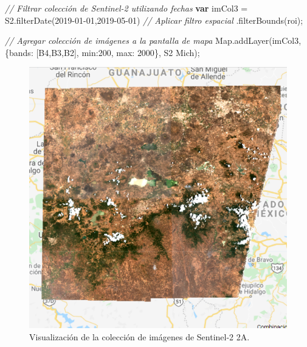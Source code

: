 \documentclass[
  12pt,
  letterpaper,
  twoside]{book}
\newenvironment{Shaded}{\begin{snugshade}}{\end{snugshade}}
\newcommand{\BuiltInTok}[1]{#1}
\newcommand{\CommentTok}[1]{\textcolor[rgb]{0.24,0.58,0.00}{\textit{#1}}}
\newcommand{\DataTypeTok}[1]{\textcolor[rgb]{0.00,0.00,0.00}{#1}}
\newcommand{\DecValTok}[1]{\textcolor[rgb]{0.28,0.53,0.93}{#1}}
\newcommand{\FunctionTok}[1]{\textcolor[rgb]{0.48,0.12,0.64}{#1}}
\newcommand{\KeywordTok}[1]{\textcolor[rgb]{0.00,0.00,0.00}{\textbf{#1}}}
\newcommand{\NormalTok}[1]{#1}
\newcommand{\OperatorTok}[1]{\textcolor[rgb]{0.00,0.00,0.00}{#1}}
\newcommand{\StringTok}[1]{\textcolor[rgb]{0.87,0.29,0.22}{#1}}
\begin{document}
\begin{Shaded}
\begin{Highlighting}[]
\CommentTok{// Filtrar colección de Sentinel{-}2 utilizando fechas}
\KeywordTok{var}\NormalTok{ imCol3 }\OperatorTok{=}\NormalTok{ S2}\OperatorTok{.}\FunctionTok{filterDate}\NormalTok{(}\StringTok{\textquotesingle{}2019{-}01{-}01\textquotesingle{}}\OperatorTok{,}\StringTok{\textquotesingle{}2019{-}05{-}01\textquotesingle{}}\NormalTok{)}
  \CommentTok{// Aplicar filtro espacial}
 \OperatorTok{.}\FunctionTok{filterBounds}\NormalTok{(roi)}\OperatorTok{;}

\CommentTok{// Agregar colección de imágenes a la pantalla de mapa}
\BuiltInTok{Map}\OperatorTok{.}\FunctionTok{addLayer}\NormalTok{(imCol3}\OperatorTok{,}\NormalTok{ \{}\DataTypeTok{bands}\OperatorTok{:}\NormalTok{ [}\StringTok{\textquotesingle{}B4\textquotesingle{}}\OperatorTok{,}\StringTok{\textquotesingle{}B3\textquotesingle{}}\OperatorTok{,}\StringTok{\textquotesingle{}B2\textquotesingle{}}\NormalTok{]}\OperatorTok{,} \DataTypeTok{min}\OperatorTok{:}\DecValTok{200}\OperatorTok{,} \DataTypeTok{max}\OperatorTok{:} \DecValTok{2000}\NormalTok{\}}\OperatorTok{,} 
  \StringTok{\textquotesingle{}S2 Mich\textquotesingle{}}\NormalTok{)}\OperatorTok{;}
\end{Highlighting}
\end{Shaded}

\begin{figure}[H]

{\centering \includegraphics[width=0.8\linewidth]{Img/visS2Mich} 

}

\caption{Visualización de la colección de imágenes de Sentinel-2 2A.}\label{fig:f103}
\end{figure}
\end{document}
